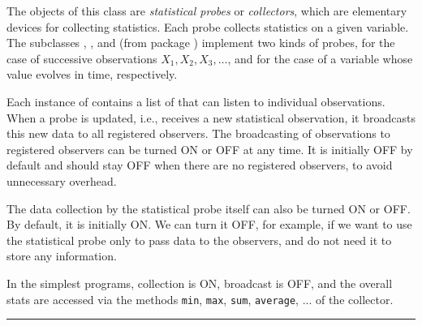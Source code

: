 
The objects of this class are \emph{statistical probes} or 
\emph{collectors}, which are elementary devices for collecting
statistics. Each probe collects statistics on a given variable.
The subclasses , , and
 (from package
)
implement two kinds of probes, for the case of successive observations
$X_1,X_2,X_3,\dots$, and for the case of a variable whose value
evolves in time, respectively.

Each instance of
 contains a list of  that can listen
to individual observations.  
When a probe is updated, i.e., receives a new statistical observation,
it broadcasts this new data to all registered observers.
The broadcasting of observations to registered observers can be turned
ON or OFF at any time.  
It is initially OFF by default and should stay OFF when there are 
no registered observers, to avoid unnecessary overhead.

The data collection by the statistical probe itself can also be turned
ON or OFF.  By default, it is initially ON.
We can turn it OFF, for example, if we want to use the statistical probe
only to pass data to the observers, and do not need it to store
any information.

In the simplest programs, collection is ON, broadcast is OFF, and the overall
stats are accessed via the methods 
\texttt{min}, \texttt{max}, \texttt{sum}, \texttt{average}, ... of the
collector.

\bigskip\hrule

